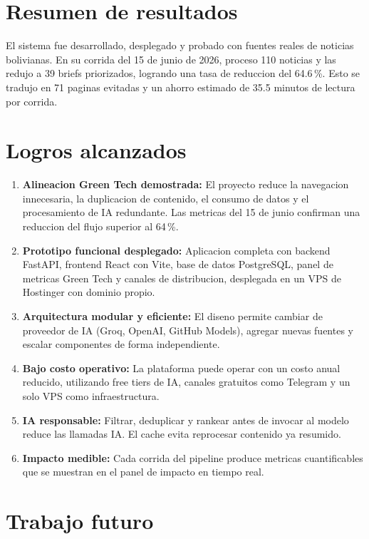 \documentclass[12pt,oneside]{report}
\begin{document}
\section*{Resumen de resultados}

El sistema fue desarrollado, desplegado y probado con fuentes reales de noticias bolivianas. En su corrida del 15 de junio de 2026, proceso 110 noticias y las redujo a 39 briefs priorizados, logrando una tasa de reduccion del 64.6\,\%. Esto se tradujo en 71 paginas evitadas y un ahorro estimado de 35.5 minutos de lectura por corrida.

\section*{Logros alcanzados}

\begin{enumerate}[nosep]
    \item \textbf{Alineacion Green Tech demostrada:} El proyecto reduce la navegacion innecesaria, la duplicacion de contenido, el consumo de datos y el procesamiento de IA redundante. Las metricas del 15 de junio confirman una reduccion del flujo superior al 64\,\%.
    \item \textbf{Prototipo funcional desplegado:} Aplicacion completa con backend FastAPI, frontend React con Vite, base de datos PostgreSQL, panel de metricas Green Tech y canales de distribucion, desplegada en un VPS de Hostinger con dominio propio.
    \item \textbf{Arquitectura modular y eficiente:} El diseno permite cambiar de proveedor de IA (Groq, OpenAI, GitHub Models), agregar nuevas fuentes y escalar componentes de forma independiente.
    \item \textbf{Bajo costo operativo:} La plataforma puede operar con un costo anual reducido, utilizando free tiers de IA, canales gratuitos como Telegram y un solo VPS como infraestructura.
    \item \textbf{IA responsable:} Filtrar, deduplicar y rankear antes de invocar al modelo reduce las llamadas IA. El cache evita reprocesar contenido ya resumido.
    \item \textbf{Impacto medible:} Cada corrida del pipeline produce metricas cuantificables que se muestran en el panel de impacto en tiempo real.
\end{enumerate}

\section*{Trabajo futuro}
\end{document}
